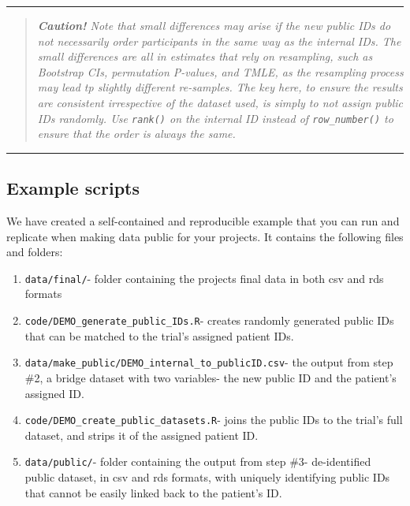 \documentclass[
]{book}
\providecommand{\tightlist}{%
  \setlength{\itemsep}{0pt}\setlength{\parskip}{0pt}}
\begin{document}
\begin{center}\rule{0.5\linewidth}{0.5pt}\end{center}

\begin{quote}
\emph{\textbf{Caution!} Note that small differences may arise if the new public IDs do not necessarily order participants in the same way as the internal IDs. The small differences are all in estimates that rely on resampling, such as Bootstrap CIs, permutation P-values, and TMLE, as the resampling process may lead tp slightly different re-samples. The key here, to ensure the results are consistent irrespective of the dataset used, is simply to not assign public IDs randomly. Use \texttt{rank()} on the internal ID instead of \texttt{row\_number()} to ensure that the order is always the same. }
\end{quote}

\begin{center}\rule{0.5\linewidth}{0.5pt}\end{center}

\subsection{Example scripts}\label{example-scripts}

We have created a self-contained and reproducible example that you can run and replicate when making data public for your projects. It contains the following files and folders:

\begin{enumerate}
\def\labelenumi{\arabic{enumi}.}
\tightlist
\item
  \texttt{data/final/}- folder containing the projects final data in both csv and rds formats\\
\item
  \texttt{code/DEMO\_generate\_public\_IDs.R}- creates randomly generated public IDs that can be matched to the trial's assigned patient IDs.\\
\item
  \texttt{data/make\_public/DEMO\_internal\_to\_publicID.csv}- the output from step \#2, a bridge dataset with two variables- the new public ID and the patient's assigned ID.\\
\item
  \texttt{code/DEMO\_create\_public\_datasets.R}- joins the public IDs to the trial's full dataset, and strips it of the assigned patient ID.
\item
  \texttt{data/public/}- folder containing the output from step \#3- de-identified public dataset, in csv and rds formats, with uniquely identifying public IDs that cannot be easily linked back to the patient's ID.
\end{enumerate}
\end{document}
